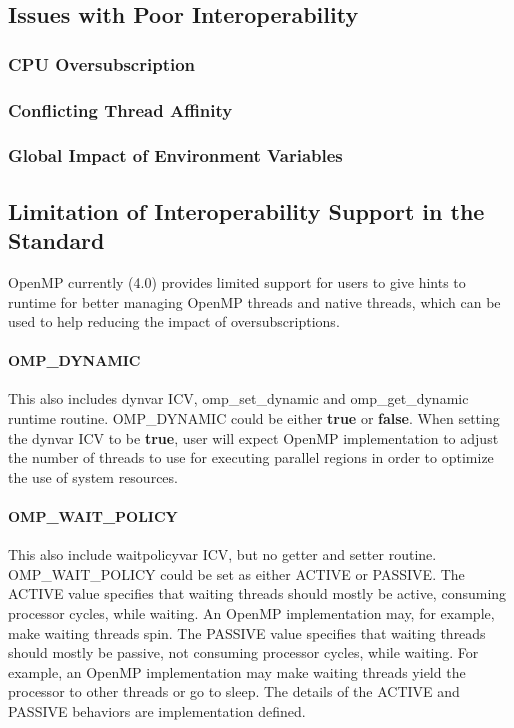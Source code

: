 \subsection{Issues with Poor Interoperability}
\subsubsection{CPU Oversubscription}


\subsubsection{Conflicting Thread Affinity}


\subsubsection{Global Impact of Environment Variables}



\subsection{Limitation of Interoperability Support in the Standard}
OpenMP currently (4.0) provides limited support for users to give hints to runtime for 
better managing OpenMP threads and native threads, which can be used to help reducing 
the impact of oversubscriptions.
\paragraph{OMP\_DYNAMIC} %
This also includes dynvar ICV, omp\_set\_dynamic and omp\_get\_dynamic runtime routine. OMP\_DYNAMIC could be either
{\bf true} or {\bf false}. When setting the dynvar ICV to be {\bf true}, user will expect
OpenMP implementation to adjust the number of threads to use for executing parallel
regions in order to optimize the use of system resources.

\paragraph{OMP\_WAIT\_POLICY} %
This also include waitpolicyvar ICV, but no getter and setter routine. 
OMP\_WAIT\_POLICY could be set as either ACTIVE or PASSIVE. 
The ACTIVE value specifies that waiting threads should mostly be active, consuming processor
 cycles, while waiting. An OpenMP implementation may, for example, make waiting threads spin.
 The PASSIVE value specifies that waiting threads should mostly be passive, not consuming
 processor cycles, while waiting. For example, an OpenMP implementation may make waiting
 threads yield the processor to other threads or go to sleep.
 The details of the ACTIVE and PASSIVE behaviors are implementation defined.
 
